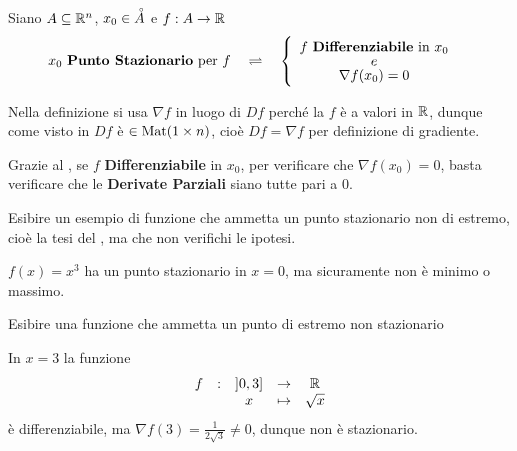 \begin{definition}
	\label{def:pto_staz}
	Siano $A \subseteq \mathbb{R}^n$, $x_0 \in \accentset{\circ}{A}$ e $f: A \to \mathbb{R}$
	\[
		x_0 \text{ \textbf{Punto Stazionario} per } f
		\quad \rightleftharpoons \quad
		\begin{cases}
			\begin{array}{c}
				f \text{ \textbf{Differenziabile} in } x_0\\[-1ex]
				e\\[-1ex]
				\nabla f(x_0) = 0
			\end{array}
		\end{cases}
	\]
	\begin{note}
		Nella definizione si usa $\nabla f$ in luogo di $Df$ perché la $f$ è a valori in $\mathbb{R}$, dunque come visto in  $Df$ è $\in \operatorname{Mat}(1 \times n)$, cioè $Df = \nabla f$ per definizione di gradiente.
	\end{note}
\end{definition}
\begin{observation}
	Grazie al , se $f$ \textbf{Differenziabile} in $x_0$, per verificare che $\nabla f(x_0) = 0$, basta verificare che le \textbf{Derivate Parziali} siano tutte pari a $0$.
\end{observation}
\begin{exercise}
	Esibire un esempio di funzione che ammetta un punto stazionario non di estremo, cioè la tesi del , ma che non verifichi le ipotesi.
	\begin{solution}
		$f(x) = x^3$ ha un punto stazionario in $x=0$, ma sicuramente non è minimo o massimo.
	\end{solution}
\end{exercise}
\begin{exercise}
	Esibire una funzione che ammetta un punto di estremo non stazionario
	\begin{solution}
		In $x = 3$ la funzione
		\[\begin{array}{ccccc} {f} & : & {\left]0,3\right]} & \to & {\mathbb{R}} \\ & & {x} & \mapsto & {\sqrt{x}} \\ \end{array}\]
		è differenziabile, ma $\nabla f(3) = \frac{1}{2\sqrt{3}} \neq 0$, dunque non è stazionario.
	\end{solution}
\end{exercise}

